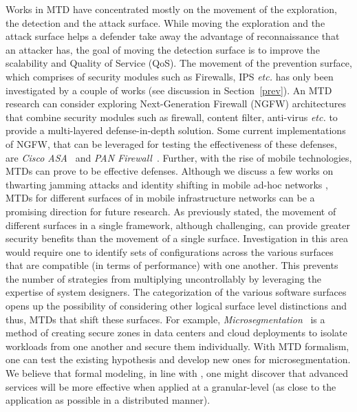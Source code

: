 Works in MTD have concentrated mostly on the movement of the exploration, the detection and the attack surface. While moving the exploration and the attack surface helps a defender take away the advantage of reconnaissance that an attacker has, the goal of moving the detection surface is to improve the scalability and Quality of Service (QoS).
The movement of the prevention surface, which comprises of security modules such as Firewalls, IPS {\em etc.} has only been investigated by a couple of works (see discussion in Section~\ref{prev}). An MTD research can consider exploring {Next-Generation Firewall} (NGFW) architectures that combine security modules such as {firewall}, {content filter}, {anti-virus} {\em etc.} to provide a multi-layered defense-in-depth solution. Some current implementations of NGFW, that can be leveraged for testing the effectiveness of these defenses, are \emph{Cisco ASA}~ and \emph{PAN Firewall}~. 
{
Further, with the rise of mobile technologies, MTDs can prove to be effective defenses.
Although we discuss a few works on thwarting jamming attacks  and identity shifting in mobile ad-hoc networks , MTDs for different surfaces of in mobile infrastructure networks can be a promising direction for future research.}
As previously stated, the movement of different surfaces in a single framework, although challenging, can provide greater security benefits than the movement of a single surface. Investigation in this area would require one to identify sets of configurations across the various surfaces that are compatible (in terms of performance) with one another. This prevents the number of strategies from multiplying uncontrollably by leveraging the expertise of system designers.
The categorization of the various software surfaces opens up the possibility of considering other logical surface level distinctions and thus, MTDs that shift these surfaces. For example, \textit{Microsegmentation}~ is a method of creating {secure zones} in data centers and cloud deployments to isolate workloads from one another and secure them individually. With MTD formalism, one can test the existing hypothesis and develop new ones for microsegmentation. We believe that formal modeling, in line with , one might discover that advanced services will be more effective when applied at a {granular-level} (as close to the application as possible in a distributed manner).

